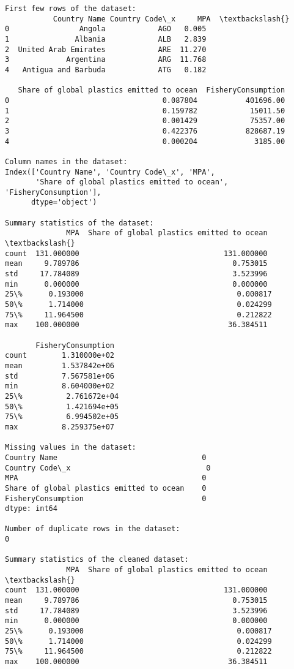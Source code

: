 \documentclass[11pt]{article}
\begin{document}
    \begin{Verbatim}[commandchars=\\\{\}]
First few rows of the dataset:
           Country Name Country Code\_x     MPA  \textbackslash{}
0                Angola            AGO   0.005
1               Albania            ALB   2.839
2  United Arab Emirates            ARE  11.270
3             Argentina            ARG  11.768
4   Antigua and Barbuda            ATG   0.182

   Share of global plastics emitted to ocean  FisheryConsumption
0                                   0.087804           401696.00
1                                   0.159782            15011.50
2                                   0.001429            75357.00
3                                   0.422376           828687.19
4                                   0.000204             3185.00

Column names in the dataset:
Index(['Country Name', 'Country Code\_x', 'MPA',
       'Share of global plastics emitted to ocean', 'FisheryConsumption'],
      dtype='object')

Summary statistics of the dataset:
              MPA  Share of global plastics emitted to ocean  \textbackslash{}
count  131.000000                                 131.000000
mean     9.789786                                   0.753015
std     17.784089                                   3.523996
min      0.000000                                   0.000000
25\%      0.193000                                   0.000817
50\%      1.714000                                   0.024299
75\%     11.964500                                   0.212822
max    100.000000                                  36.384511

       FisheryConsumption
count        1.310000e+02
mean         1.537842e+06
std          7.567581e+06
min          8.604000e+02
25\%          2.761672e+04
50\%          1.421694e+05
75\%          6.994502e+05
max          8.259375e+07

Missing values in the dataset:
Country Name                                 0
Country Code\_x                               0
MPA                                          0
Share of global plastics emitted to ocean    0
FisheryConsumption                           0
dtype: int64

Number of duplicate rows in the dataset:
0

Summary statistics of the cleaned dataset:
              MPA  Share of global plastics emitted to ocean  \textbackslash{}
count  131.000000                                 131.000000
mean     9.789786                                   0.753015
std     17.784089                                   3.523996
min      0.000000                                   0.000000
25\%      0.193000                                   0.000817
50\%      1.714000                                   0.024299
75\%     11.964500                                   0.212822
max    100.000000                                  36.384511


\end{Verbatim}
\end{document}
